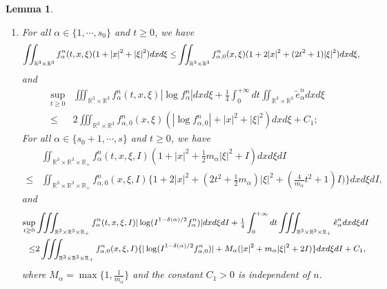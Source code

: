 \documentclass[reqno,11pt]{amsart}
\newtheorem{lemma}{Lemma}[section]
\numberwithin{equation}{section}
\def\R{\mathbb{R}}
\begin{document}
\begin{lemma}
\begin{enumerate}
\item{For all $\alpha \in \{1,\cdots,s_0\}$ and $t \geq 0$, we have
	\begin{equation}\label{FB2}{\small
		\begin{aligned}
  \iint_{ \R^3 \times \R^3} f^n_\alpha (t,x,\xi)(1+|x|^2+|\xi|^2)dxd\xi \leq & \iint_{ \R^3 \times \R^3} f^n_{\alpha,0}(x,\xi)(1+2|x|^2+(2t^2+1)|\xi|^2)dxd\xi,
  \end{aligned}}
	\end{equation}
and
 \begin{equation}\label{FWC2}
		\begin{aligned}
			\sup \limits_{t\geq 0}&\iiint_{ \R^3 \times \R^3} f^n_\alpha(t,x,\xi)|\log f^n_\alpha| dxd\xi +\tfrac{1}{4}\int_{0}^{+\infty} dt \iint_{ \R^3 \times \R^3} \tilde{e}^n_\alpha dxd\xi \\
		   \leq & 2 \iiint_{ \R^3 \times \R^3} f^n_{\alpha,0}(x,\xi) (|\log f^n_{\alpha,0}|+ |x|^2+ |\xi|^2 )dxd\xi +C_1;
		\end{aligned}
	\end{equation}
	For all $\alpha \in \{s_0+1,\cdots,s\}$ and $t \geq 0$, we have
	\begin{equation}\label{FB3}
		\begin{aligned}
   &\iint_{ \R^3 \times \R^3\times \R_+ } f^n_\alpha (t,x,\xi,I)(1+|x|^2+ \tfrac{1}{2} m_\alpha |\xi|^2+I)dxd\xi dI\\
  \leq & \iint_{ \R^3 \times \R^3\times \R_+ } f^n_{\alpha,0}(x,\xi,I ) \{ 1 + 2 |x|^2 + ( 2 t^2 + \tfrac{1}{2} m_\alpha ) |\xi|^2 + (\tfrac{4}{m_\alpha} t^2 + 1) I )\} dxd\xi dI,
\end{aligned}
\end{equation}
and
 \begin{equation}\label{FWC3}{\small
		\begin{aligned}
			\sup \limits_{t\geq 0}& \iiint_{ \R^3 \times \R^3\times \R_+} f^n_\alpha(t,x,\xi,I) |\log (I^{1-\delta(\alpha)/2}f^n_\alpha)| dxd\xi dI +\tfrac{1}{4}\int_{0}^{+\infty} dt \iiint_{ \R^3 \times \R^3\times \R_+} \tilde{e}^n_\alpha dxd\xi dI\\
		\leq & 2 \iiint_{ \R^3 \times \R^3\times \R_+} f^n_{\alpha,0}(x,\xi,I )\{|\log (I^{1-\delta(\alpha)/2}f^n_{\alpha,0})|+ M_\alpha(|x|^2+m_\alpha |\xi|^2 +2I)\}dxd\xi dI+C_1,
		\end{aligned}}
\end{equation}
where $M_\alpha = \max \{1,\frac{1}{m_\alpha}\}$ and the constant $C_1>0$ is independent of $n$.}\label{3 of Lemma 4.17}
\end{enumerate}
\end{lemma}
\end{document}
